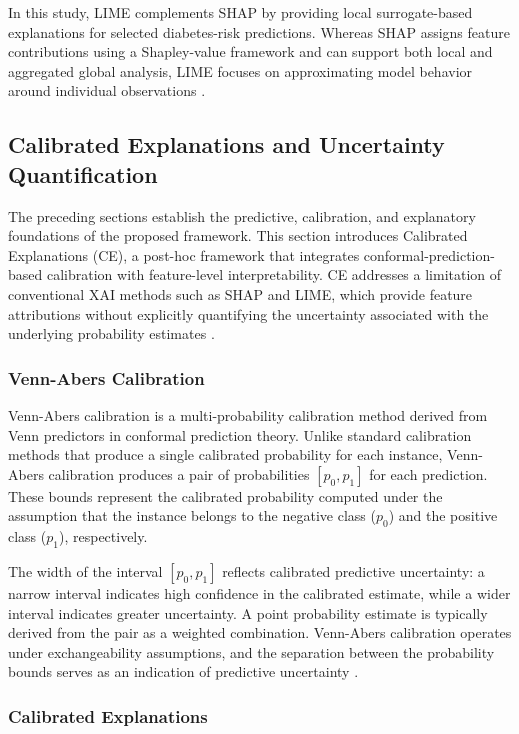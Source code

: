 In this study, LIME complements SHAP by providing local surrogate-based
explanations for selected diabetes-risk predictions. Whereas SHAP assigns
feature contributions using a Shapley-value framework and can support both
local and aggregated global analysis, LIME focuses on approximating model
behavior around individual observations
\cite{wang_diabetes_lime_2023, lu_uddin_stacking_2022}.

\subsection{Calibrated Explanations and Uncertainty Quantification}

The preceding sections establish the predictive, calibration, and
explanatory foundations of the proposed framework. This section introduces
Calibrated Explanations (CE), a post-hoc framework that integrates
conformal-prediction-based calibration with feature-level interpretability.
CE addresses a limitation of conventional XAI methods such as SHAP and
LIME, which provide feature attributions without explicitly quantifying the
uncertainty associated with the underlying probability estimates
\cite{lofstrom_ce_2024}.

\subsubsection{Venn-Abers Calibration}

Venn-Abers calibration is a multi-probability calibration method derived
from Venn predictors in conformal prediction theory. Unlike standard
calibration methods that produce a single calibrated probability for each
instance, Venn-Abers calibration produces a pair of probabilities
$[p_0, p_1]$ for each prediction. These bounds represent the calibrated
probability computed under the assumption that the instance belongs to the
negative class ($p_0$) and the positive class ($p_1$), respectively.

The width of the interval $[p_0, p_1]$ reflects calibrated predictive
uncertainty: a narrow interval indicates high confidence in the calibrated
estimate, while a wider interval indicates greater uncertainty. A point
probability estimate is typically derived from the pair as a weighted
combination. Venn-Abers calibration operates under exchangeability
assumptions, and the separation between the probability bounds serves as
an indication of predictive uncertainty
\cite{nouretdinov_venn_abers_2024}.

\subsubsection{Calibrated Explanations}

